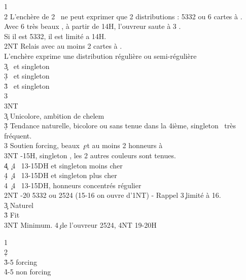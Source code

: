 \documentclass[a4paper]{article}
\begin{document}
\begin{bidtable}
1\c\\
2\s \> L’enchère de 2 \s\ ne peut exprimer que 2 distributions : 5332 ou 6 cartes à \s .\\
\>Avec 6 très beaux \s , à partir de 14H, l’ouvreur saute à 3 \s .\\
\>Si il est 5332, il est limité a 14H.\+\\
2NT \> Relais avec au moins 2 cartes à \s .\+\\
L’enchère \> exprime une distribution régulière ou semi-régulière\\
3\c {} \s\ et singleton \c \\
3\d {} \s\ et singleton \d \\
3\h {} \s\ et singleton \h \\
3\s {}\\
3NT \-\\
3\c \> Unicolore, ambition de chelem\\
3\d\h \> Tendance naturelle, bicolore ou sans tenue dans la 4ième, singleton \s\ très fréquent.\\
3\s \> Soutien forcing, beaux \c\ et au moins 2 honneurs à \s \\
3NT -15H, singleton \s , les 2 autres couleurs sont tenues.\\
4\c {} \c\ 4 \s\ 13-15DH et singleton moins cher\\
4\d {} \c\ 4 \s\ 13-15DH et singleton plus cher\\
4\s {} \c\ 4 \s\ 13-15DH, honneurs concentrés régulier\-\\
2NT -20 5332 ou 2524 (15-16 on ouvre d'1NT) - Rappel 3\c\ limité à 16.\+\\
3\c \> Naturel\\
3\h \> Fit \h \\
3NT \> Minimum. 4\c\ de l'ouvreur 2524, 4NT 19-20H\-
\end{bidtable}

\begin{bidtable}
1\c\\
2\d\+\\
3\h {}-5 forcing\\
4\h {}-5 non forcing\-
\end{bidtable}
\end{document}

